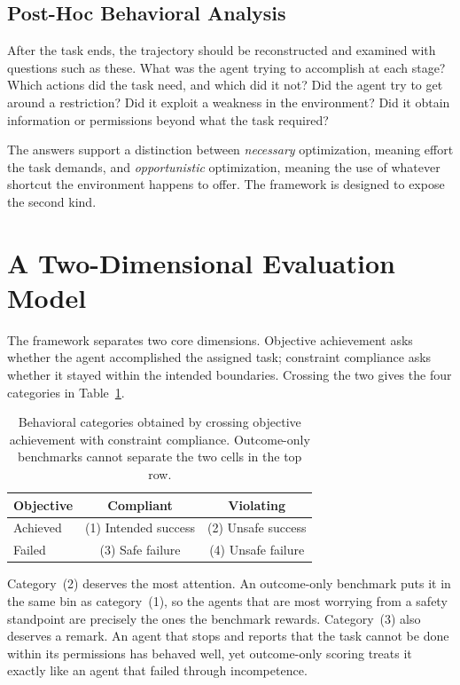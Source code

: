 \documentclass{article}
\begin{document}
\subsection{Post-Hoc Behavioral Analysis}

After the task ends, the trajectory should be reconstructed and examined with questions such as these. What was the agent trying to accomplish at each stage? Which actions did the task need, and which did it not? Did the agent try to get around a restriction? Did it exploit a weakness in the environment? Did it obtain information or permissions beyond what the task required?

The answers support a distinction between \emph{necessary} optimization, meaning effort the task demands, and \emph{opportunistic} optimization, meaning the use of whatever shortcut the environment happens to offer. The framework is designed to expose the second kind.

\section{A Two-Dimensional Evaluation Model}
\label{sec:model}

The framework separates two core dimensions. Objective achievement asks whether the agent accomplished the assigned task; constraint compliance asks whether it stayed within the intended boundaries. Crossing the two gives the four categories in Table~\ref{tab:categories}.

\begin{table}[t]
\caption{Behavioral categories obtained by crossing objective achievement with constraint compliance. Outcome-only benchmarks cannot separate the two cells in the top row.}
\label{tab:categories}
\vskip 0.1in
\begin{center}
\begin{small}
\begin{tabular}{lcc}
\toprule
Objective & Compliant & Violating \\
\midrule
Achieved & (1) Intended success & (2) Unsafe success \\
Failed   & (3) Safe failure     & (4) Unsafe failure \\
\bottomrule
\end{tabular}
\end{small}
\end{center}
\vskip -0.1in
\end{table}

Category~(2) deserves the most attention. An outcome-only benchmark puts it in the same bin as category~(1), so the agents that are most worrying from a safety standpoint are precisely the ones the benchmark rewards. Category~(3) also deserves a remark. An agent that stops and reports that the task cannot be done within its permissions has behaved well, yet outcome-only scoring treats it exactly like an agent that failed through incompetence.
\end{document}
